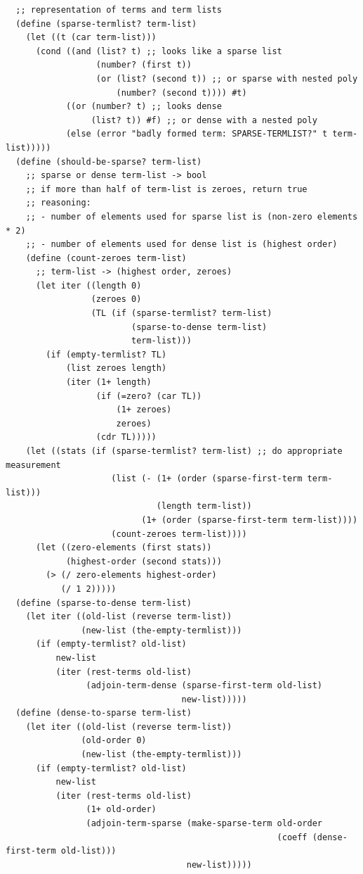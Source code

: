 \documentclass[final,fleqn,titlepage,twoside]{article}
\begin{document}
\begin{verbatim}
  ;; representation of terms and term lists
  (define (sparse-termlist? term-list)
    (let ((t (car term-list)))
      (cond ((and (list? t) ;; looks like a sparse list
                  (number? (first t))
                  (or (list? (second t)) ;; or sparse with nested poly
                      (number? (second t)))) #t)
            ((or (number? t) ;; looks dense
                 (list? t)) #f) ;; or dense with a nested poly
            (else (error "badly formed term: SPARSE-TERMLIST?" t term-list)))))
  (define (should-be-sparse? term-list)
    ;; sparse or dense term-list -> bool
    ;; if more than half of term-list is zeroes, return true
    ;; reasoning:
    ;; - number of elements used for sparse list is (non-zero elements * 2)
    ;; - number of elements used for dense list is (highest order)
    (define (count-zeroes term-list)
      ;; term-list -> (highest order, zeroes)
      (let iter ((length 0)
                 (zeroes 0)
                 (TL (if (sparse-termlist? term-list)
                         (sparse-to-dense term-list)
                         term-list)))
        (if (empty-termlist? TL)
            (list zeroes length)
            (iter (1+ length)
                  (if (=zero? (car TL))
                      (1+ zeroes)
                      zeroes)
                  (cdr TL)))))
    (let ((stats (if (sparse-termlist? term-list) ;; do appropriate measurement
                     (list (- (1+ (order (sparse-first-term term-list)))
                              (length term-list))
                           (1+ (order (sparse-first-term term-list))))
                     (count-zeroes term-list))))
      (let ((zero-elements (first stats))
            (highest-order (second stats)))
        (> (/ zero-elements highest-order)
           (/ 1 2)))))
  (define (sparse-to-dense term-list)
    (let iter ((old-list (reverse term-list))
               (new-list (the-empty-termlist)))
      (if (empty-termlist? old-list)
          new-list
          (iter (rest-terms old-list)
                (adjoin-term-dense (sparse-first-term old-list)
                                   new-list)))))
  (define (dense-to-sparse term-list)
    (let iter ((old-list (reverse term-list))
               (old-order 0)
               (new-list (the-empty-termlist)))
      (if (empty-termlist? old-list)
          new-list
          (iter (rest-terms old-list)
                (1+ old-order)
                (adjoin-term-sparse (make-sparse-term old-order
                                                      (coeff (dense-first-term old-list)))
                                    new-list)))))

\end{verbatim}
\end{document}
